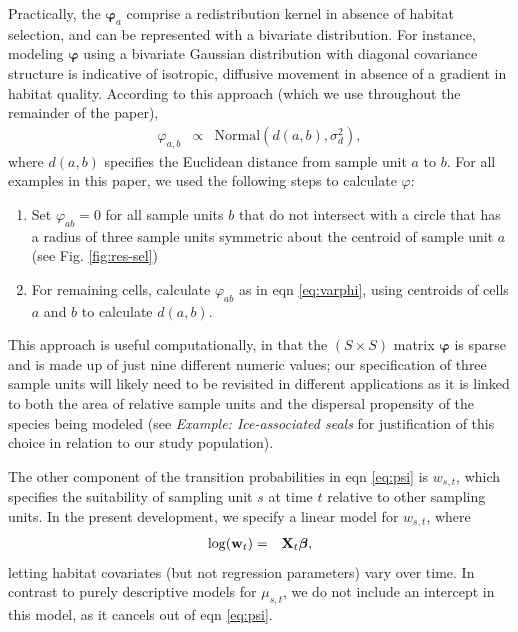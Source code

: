 \documentclass[times,mee,doublespace,]{besauth2}
\begin{document}
Practically, the $\boldsymbol{\varphi}_a$ comprise a redistribution kernel in absence of habitat selection, and can be represented with a bivariate distribution.  For instance, modeling $\boldsymbol{\varphi}$ using a bivariate Gaussian distribution with diagonal covariance structure is indicative of isotropic, diffusive movement in absence of a gradient in habitat quality.  According to this approach (which we use throughout the remainder of the paper),
\begin{eqnarray}
  \varphi_{a,b} & \propto & \text{Normal}(d(a,b),\sigma_d^2), \label{eq:varphi}
\end{eqnarray}
where $d(a,b)$ specifies the Euclidean distance from sample unit $a$ to $b$.  For all examples in this paper, we used the following steps to calculate $\varphi$:
\begin{enumerate}
  \item Set $\varphi_{ab}=0$ for all sample units $b$ that do not intersect with a circle that has a radius of three sample units symmetric about the centroid of sample unit $a$ (see Fig. \ref{fig:res-sel})
  \item For remaining cells, calculate $\varphi_{ab}$ as in eqn \ref{eq:varphi}, using centroids of cells $a$ and $b$ to calculate $d(a,b)$.
\end{enumerate}
This approach is useful computationally, in that the $(S \times S)$ matrix $\boldsymbol{\varphi}$ is sparse and is made up of just nine different numeric values; our specification of three sample units will likely need to be revisited in different applications as it is linked to both the area of relative sample units and the dispersal propensity of the species being modeled (see {\it Example: Ice-associated seals} for justification of this choice in relation to our study population).

The other component of the transition probabilities in eqn \ref{eq:psi} is $w_{s,t}$, which specifies the suitability of sampling unit $s$ at time $t$ relative to other sampling units.  In the present development, we specify a linear model for $w_{s,t}$, where
\begin{eqnarray*}
  \log({\bf w}_t) & = & {\bf X}_t \boldsymbol{\beta}, %
\end{eqnarray*}
letting habitat covariates (but not regression parameters) vary over time.  In contrast to purely descriptive models for $\mu_{s,t}$, we do not include an intercept in this model, as it cancels out of eqn \ref{eq:psi}.
\end{document}
